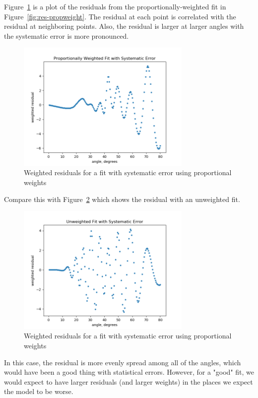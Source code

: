 \documentclass[english]{scrartcl}
\begin{document}
Figure~\ref{fig:res-sp} is a plot of the residuals from the
proportionally-weighted
fit in Figure~\ref{fig:res-propweight}. The residual at each point
is correlated with the residual at neighboring points. Also,
the residual is larger at larger angles with the systematic
error is more pronounced.
\begin{figure}[htb]
  \begin{center}
    \includegraphics[width=0.75\textwidth]{images/res-sp}
  \end{center}
  \caption{\label{fig:res-sp}Weighted residuals
  for a fit with systematic error using proportional weights}
\end{figure}

Compare this with Figure~\ref{fig:res-su} which shows the residual
with an unweighted fit.
\begin{figure}[htb]
  \begin{center}
    \includegraphics[width=0.75\textwidth]{images/res-su}
  \end{center}
  \caption{\label{fig:res-su}Weighted residuals
  for a fit with systematic error using proportional weights}
\end{figure}
In this case, the residual is more evenly spread among all of the
angles, which would have been a good thing with statistical
errors. However, for a "good" fit, we would expect to have
larger residuals (and larger weights) in the places we expect
the model to be worse.
\end{document}
